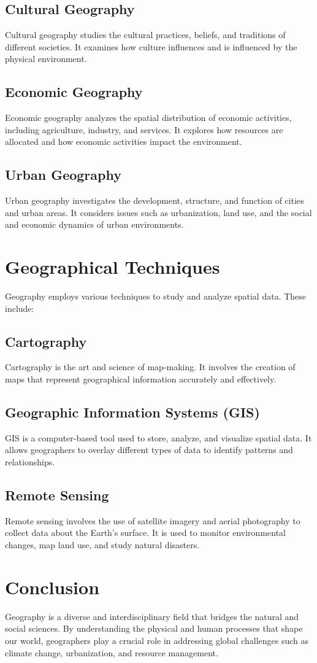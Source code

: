 \documentclass[12pt]{article}
\begin{document}
\subsection*{Cultural Geography}
Cultural geography studies the cultural practices, beliefs, and traditions of different societies. It examines how culture influences and is influenced by the physical environment.

\subsection*{Economic Geography}
Economic geography analyzes the spatial distribution of economic activities, including agriculture, industry, and services. It explores how resources are allocated and how economic activities impact the environment.

\subsection*{Urban Geography}
Urban geography investigates the development, structure, and function of cities and urban areas. It considers issues such as urbanization, land use, and the social and economic dynamics of urban environments.

\section*{Geographical Techniques}
Geography employs various techniques to study and analyze spatial data. These include:

\subsection*{Cartography}
Cartography is the art and science of map-making. It involves the creation of maps that represent geographical information accurately and effectively.

\subsection*{Geographic Information Systems (GIS)}
GIS is a computer-based tool used to store, analyze, and visualize spatial data. It allows geographers to overlay different types of data to identify patterns and relationships.

\subsection*{Remote Sensing}
Remote sensing involves the use of satellite imagery and aerial photography to collect data about the Earth's surface. It is used to monitor environmental changes, map land use, and study natural disasters.

\section*{Conclusion}
Geography is a diverse and interdisciplinary field that bridges the natural and social sciences. By understanding the physical and human processes that shape our world, geographers play a crucial role in addressing global challenges such as climate change, urbanization, and resource management.
\end{document}
